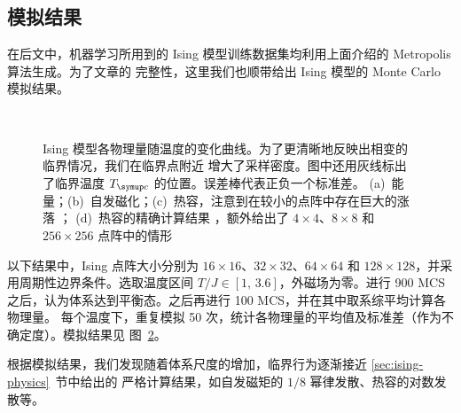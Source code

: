 \subsection{模拟结果}

在后文中，机器学习所用到的 Ising 模型训练数据集均利用上面介绍的 Metropolis 算法生成。为了文章的
完整性，这里我们也顺带给出 Ising 模型的 Monte Carlo 模拟结果。

\begin{figure}[htb]
  \begin{subfigure}[b]{0.47\textwidth}
    \hfill
  \end{subfigure}
  \begin{subfigure}[b]{0.47\textwidth}
    \hfill
  \end{subfigure}
  \\[3ex]
  \begin{subfigure}[b]{0.47\textwidth}
    \hfill
  \end{subfigure}
  \begin{subfigure}[b]{0.47\textwidth}
    \hfill
    \label{fig:ising-cv-exact}
  \end{subfigure}
  \caption{Ising 模型各物理量随温度的变化曲线。为了更清晰地反映出相变的临界情况，我们在临界点附近
    增大了采样密度。图中还用灰线标出了临界温度 $\Tc$ 的位置。误差棒代表正负一个标准差。
    (a)~能量；(b)~自发磁化；(c)~热容，注意到在较小的点阵中存在巨大的涨落 \protect\footnotemark{}；
    (d)~热容的精确计算结果 \cite{pathria}，额外给出了 $4 \times 4$、$8 \times 8$ 和
    $256 \times 256$ 点阵中的情形}
  \label{fig:ising-observables}
\end{figure}


以下结果中，Ising 点阵大小分别为 $16 \times 16$、$32 \times 32$、$64 \times 64$ 和
$128 \times 128$，并采用周期性边界条件。选取温度区间 $T/J \in [1,\,3.6]$，外磁场为零。进行
\num{900} MCS 之后，认为体系达到平衡态。之后再进行 \num{100} MCS，并在其中取系综平均计算各物理量。
每个温度下，重复模拟 50 次，统计各物理量的平均值及标准差（作为不确定度）。模拟结果见
图~\ref{fig:ising-observables}。

根据模拟结果，我们发现随着体系尺度的增加，临界行为逐渐接近 \ref{sec:ising-physics}~节中给出的
严格计算结果，如自发磁矩的 $1/8$ 幂律发散、热容的对数发散等。

